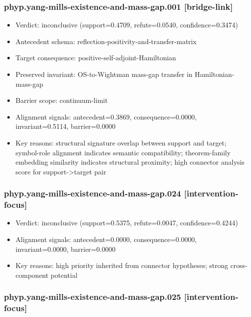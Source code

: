 \documentclass[
]{article}
\providecommand{\tightlist}{%
  \setlength{\itemsep}{0pt}\setlength{\parskip}{0pt}}
\begin{document}
\subsubsection{phyp.yang-mills-existence-and-mass-gap.001
{[}bridge-link{]}}\label{phypyang-mills-existence-and-mass-gap001-bridge-link}

\begin{itemize}
\tightlist
\item
  Verdict: inconclusive (support=0.4709, refute=0.0540,
  confidence=0.3474)
\item
  Antecedent schema: reflection-positivity-and-transfer-matrix
\item
  Target consequence: positive-self-adjoint-Hamiltonian
\item
  Preserved invariant: OS-to-Wightman mass-gap transfer in
  Hamiltonian-mass-gap
\item
  Barrier scope: continuum-limit
\item
  Alignment signals: antecedent=0.3869, consequence=0.0000,
  invariant=0.5114, barrier=0.0000
\item
  Key reasons: structural signature overlap between support and target;
  symbol-role alignment indicates semantic compatibility; theorem-family
  embedding similarity indicates structural proximity; high connector
  analysis score for support-\textgreater target pair
\end{itemize}

\subsubsection{phyp.yang-mills-existence-and-mass-gap.024
{[}intervention-focus{]}}\label{phypyang-mills-existence-and-mass-gap024-intervention-focus}

\begin{itemize}
\tightlist
\item
  Verdict: inconclusive (support=0.5375, refute=0.0047,
  confidence=0.4244)
\item
  Alignment signals: antecedent=0.0000, consequence=0.0000,
  invariant=0.0000, barrier=0.0000
\item
  Key reasons: high priority inherited from connector hypotheses; strong
  cross-component potential
\end{itemize}

\subsubsection{phyp.yang-mills-existence-and-mass-gap.025
{[}intervention-focus{]}}\label{phypyang-mills-existence-and-mass-gap025-intervention-focus}
\end{document}
